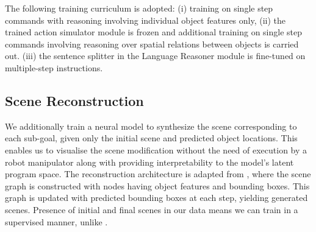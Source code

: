 The following training curriculum is adopted: (i) training on single step commands with reasoning involving individual object features only, 
(ii) the trained action simulator module is frozen and additional training on single step commands involving reasoning over spatial relations between objects is carried out. 
(iii) the sentence splitter in the Language Reasoner module is fine-tuned on multiple-step instructions. 
\subsection{Scene Reconstruction}
We additionally train a neural model to synthesize the scene corresponding to each sub-goal, given only the initial scene and predicted object locations. This enables us to visualise the scene modification without the need of execution by a robot manipulator along with providing interpretability to the model's latent program space.
The reconstruction architecture is adapted from \cite{dhamo2020_SIMSG}, where the scene graph is constructed with nodes having object features and bounding boxes. This graph is updated with predicted bounding boxes at each step, yielding generated scenes. Presence of initial and final scenes in our data means we can train in a supervised manner, unlike \cite{dhamo2020_SIMSG}.